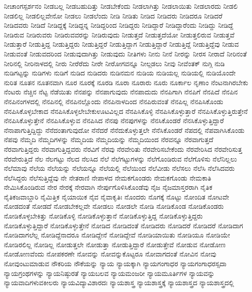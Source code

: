 {ನೀಚಾಂಗಸ್ಪರ್ಶನಂ
ನೀಡಬಲ್ಲ
ನೀಡಬಹುದಿತ್ತು
ನೀಡಬೇಕೆಂದು
ನೀಡಲಾಗಿತ್ತು
ನೀಡಲಾಯಿತು
ನೀಡಲಾರದು
ನೀಡಲಿ
ನೀಡಲಿಲ್ಲ
ನೀಡಲಿಲ್ಲವೇನೋ
ನೀಡಲು
ನೀಡಲೆಂದು
ನೀಡಿ
ನೀಡಿತು
ನೀಡಿದ
ನೀಡಿದರು
ನೀಡಿದರೂ
ನೀಡಿದರೆ
ನೀಡಿದವರು
ನೀಡಿದೆ
ನೀಡಿದ್ದಕ್ಕೆ
ನೀಡಿದ್ದನ್ನ
ನೀಡಿದ್ದರಿಂದ
ನೀಡಿದ್ದರು
ನೀಡಿದ್ದಾರೆ
ನೀಡಿದ್ದಾರೆಂದು
ನೀಡಿದ್ದು
ನೀಡಿದ್ದೆ
ನೀಡಿರುವ
ನೀಡಿರುವರು
ನೀಡಿರುವವರನ್ನು
ನೀಡಿರುವುದು
ನೀಡುತ್ತದೆ
ನೀಡುತ್ತದೆಯೋ
ನೀಡುತ್ತಲಿರುವ
ನೀಡುತ್ತವೆ
ನೀಡುತ್ತಾರೆ
ನೀಡುತ್ತಿದ್ದ
ನೀಡುತ್ತಿದ್ದರು
ನೀಡುತ್ತಿದ್ದರೆ
ನೀಡುತ್ತಿದ್ದಾಗ
ನೀಡುತ್ತಿದ್ದಾರೆ
ನೀಡುತ್ತಿದ್ದೆ
ನೀಡುತ್ತಿದ್ದೆವು
ನೀಡುವ
ನೀಡುವಂತೆ
ನೀಡುವದರಿಂದ
ನೀಡುವುದಾಗಿತ್ತು
ನೀಡುವುದು
ನೀತಿಗಳು
ನೀನು
ನೀನೆ
ನೀರನ್ನು
ನೀರಸ
ನೀರಾದೆ
ನೀರಿನಂತೆ
ನೀರಿನಲ್ಲಿ
ನೀರಿನಾಳದಲ್ಲಿ
ನೀರು
ನೀರೆರೆದು
ನೀರೇ
ನೀರೋಗವನ್ನೂ
ನೀಲ್ಗಡಲು
ನೀವು
ನೀವೆಂತಕ್
ನುಗ್ಗಿ
ನುಡಿ
ನುಡಿಗಟ್ಟನ್ನು
ನುಡಿಗಳು
ನುಡಿಗೆ
ನುಡಿದ
ನುಡಿದರು
ನುಡಿನಮನ
ನುಡಿಯ
ನುಡಿಯಲ್ಲ
ನುಡಿಯಲ್ಲಿ
ನುಡಿಯೊಂದೇ
ನುರಿತ
ನೂತನ
ನೂತನವಾಗಿ
ನೂರ
ನೂರಕ್ಕೆ
ನೂರಡಿ
ನೂರಾ
ನೂರಾರು
ನೂರು
ನೂರ್ಕಾಲ
ನೃಣಾಂ
ನೆಂಟನಾಗಿರಬೇಕು
ನೆಂಟರು
ನೆಚ್ಚಿನ
ನೆಟ್ಟ
ನೆಡೆಯಿತು
ನೆನಪನ್ನು
ನೆನಪಾಗುವುದು
ನೆನಪಾದುದು
ನೆನಪಿಗಾಗಿ
ನೆನಪಿಗೆ
ನೆನಪಿದೆ
ನೆನಪಿನ
ನೆನಪಿನಂಗಳದಲ್ಲಿ
ನೆನಪಿನಲ್ಲಿ
ನೆನಪಿನಲ್ಲೊಂದು
ನೆನಪಿನಾಳದಿಂದ
ನೆನಪಿರುವಂತೆ
ನೆನಪಿಲ್ಲ
ನೆನಪಿಸಿಕೊಂಡು
ನೆನಪಿಸಿಕೊಳ್ಳಬೇಕಾದ
ನೆನಪಿಸಿಕೊಳ್ಳಲೇಬೇಕುಊಟವಿಲ್ಲದ
ನೆನಪಿಸಿಕೊಳ್ಳಿ
ನೆನಪಿಸಿಕೊಳ್ಳುತ್ತಾರೆ
ನೆನಪಿಸಿಕೊಳ್ಳುತ್ತಿರುತ್ತೇನೆ
ನೆನಪಿಸಿಕೊಳ್ಳುತ್ತೇನೆ
ನೆನಪಿಸಿಕೊಳ್ಳುವ
ನೆನಪಿಸಿದ
ನೆನಪು
ನೆನಪುಗಳನ್ನು
ನೆನಸಿಕೊಂಡರೆ
ನೆನಸಿಕೊಳ್ಳುತ್ತಿದ್ದಾರೆ
ನೆನಾಪಾಗುತ್ತಿದ್ದಿದ್ದು
ನೆನೆದಂತಾಗುವುದೋ
ನೆನೆದರೆ
ನೆನೆದುಕೊಳ್ಳುತ್ತಲೇ
ನೆನೆಸಿಕೊಂಡರೆ
ನೆಪದಲ್ಲಿ
ನೆಪವಾಗಿಸಿಕೊಂಡು
ನೆಪವು
ನೆಮ್ಮದಿ
ನೆಮ್ಮದಿಗಳನ್ನು
ನೆಮ್ಮದಿಯ
ನೆಮ್ಮದಿಯನ್ನು
ನೆಮ್ಮದಿಯಿಂದ
ನೆರವನ್ನೂ
ನೆರವಾಗುತ್ತದೆ
ನೆರವಾಗುತ್ತಿದ್ದರು
ನೆರವಾಗುತ್ತಿದ್ದವರು
ನೆರವಿಗೆ
ನೆರವು
ನೆರವೇರಿತು
ನೆರವೇರಿಸಬೇಕೆಂದು
ನೆರವೇರಿಸಿದ
ನೆರವೇರಿಸುತ್ತ
ನೆರವೇರುತ್ತಿದೆ
ನೆಲ
ನೆಲಗಟ್ಟು
ನೆಲದ
ನೆಲಸಿದ
ನೆಲೆ
ನೆಲೆಗಟ್ಟುಗಳನ್ನು
ನೆಲೆಗೊಂಡಿರುವ
ನೆಲೆಗೊಳಿಸು
ನೆಲೆನಿಲ್ಲಲು
ನೆಲೆಮಾವು
ನೆಲೆಯ
ನೆಲೆಯನ್ನು
ನೆಲೆಯನ್ನೂ
ನೆಲೆಯಲ್ಲಿ
ನೆಲೆಯಿಂದ
ನೆಲೆವೀಡು
ನೆಲೆಸಲು
ನೆಲೆಸಿ
ನೆಲೆಸಿದವರು
ನೆಲೆಸಿದ್ದರು
ನೆಲೆಸುತ್ತಿದ್ದೆವು
ನೇ
ನೇತರಾಣಿ
ನೇಪಾಳದ
ನೇಮಕಗೊಂಡರು
ನೇಮಕಗೊಂಡು
ನೇಮಕಾತಿ
ನೇಮಿಸಿಕೊಂಡಿರುವ
ನೇರ
ನೇರಕ್ಕೆ
ನೇರವಾಗಿ
ನೇರ್ಪುಗೊಳಿಸಿಕೊಂಡೆವು
ನೈಜ
ನೈಜಮಾಸ್ತರರಾಗಿ
ನೈತಿಕ
ನೈತಿಕಜವಾಬ್ದಾರಿ
ನೈಮಿತ್ತಿಕ
ನೈಯಾಯಿಕ
ನೈವ
ನೈವಾಕೃತಿಃ
ನೊಂದರು
ನೊಗಕ್ಕೆ
ನೊಟ್ಟು
ನೋಂದಿತ
ನೋಟವೇ
ನೋಡದಂತೆ
ನೋಡದೆ
ನೋಡಬೇಕಲ್ಲವೇ
ನೋಡಲು
ನೋಡಲೇ
ನೋಡಿ
ನೋಡಿಕೊಂಡ
ನೋಡಿಕೊಂಡರು
ನೋಡಿಕೊಳ್ಳಬೇಕಿತ್ತು
ನೋಡಿಕೊಳ್ಳಿ
ನೋಡಿಕೊಳ್ಳುತ್ತಾನೆ
ನೋಡಿಕೊಳ್ಳುತ್ತಿದ್ದ
ನೋಡಿಕೊಳ್ಳುತ್ತಿದ್ದರು
ನೋಡಿಕೊಳ್ಳುತ್ತಿದ್ದಾರೆ
ನೋಡಿಕೊಳ್ಳುತ್ತೇನೆ
ನೋಡಿದ
ನೋಡಿದಂತೆ
ನೋಡಿದರು
ನೋಡಿದರೆ
ನೋಡಿದರೆ
ನೋಡಿದಾಗ
ನೋಡಿದಾಗಲೆಲ್ಲ
ನೋಡಿದ್ದೆನಾದರೂ
ನೋಡಿದ್ದೇನೆ
ನೋಡಿದ್ದೇವೆ
ನೋಡಿಯಾಯಿತು
ನೋಡಿಯೂ
ನೋಡಿಯೇ
ನೋಡಿರಲಿಲ್ಲ
ನೋಡಿಲ್ಲ
ನೋಡುತ್ತಲೇ
ನೋಡುತ್ತಾ
ನೋಡುತ್ತಿದ್ದಾರೆ
ನೋಡುತ್ತೇವೆ
ನೋಡುವ
ನೋಡೋಣ
ನೋಡೋಣವೆಂದು
ನೋಪಕರಣೇ
ನೋವನ್ನು
ನೋವನ್ನುಕೊಟ್ಟರೂ
ನೋವಾಗದಂತೆ
ನೋವಿನ
ನೋವು
ನೋವುಂಟುಮಾಡುವ
ನೌಕರಿಯ
ನೌಕೆಯನ್ನು
ನ್ಯಾಯ
ನ್ಯಾಯಕ್ಕಾಗಿ
ನ್ಯಾಯಗಂಗಾಧರ
ನ್ಯಾಯಗಂಗಾಧರಸ್ಸದಾ
ನ್ಯಾಯಗ್ರಂಥಗಳನ್ನು
ನ್ಯಾಯನಿಷ್ಠುರತೆ
ನ್ಯಾಯಬಲವ
ನ್ಯಾಯಮಂಜರೀ
ನ್ಯಾಯಮೂರ್ತಿಗಳ
ನ್ಯಾಯವನ್ನು
ನ್ಯಾಯವಾದಿಗಳುವಕೀಲರು
ನ್ಯಾಯವಿದ್ಯಾವಿಶಾರದಃ
ನ್ಯಾಯಶಾಸ್ತ್ರ
ನ್ಯಾಯಶಾಸ್ತ್ರಕ್ಕೆ
ನ್ಯಾಯಶಾಸ್ತ್ರದ
ನ್ಯಾಯಶಾಸ್ತ್ರದಲ್ಲಿ
}
